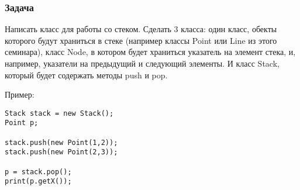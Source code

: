 \begin{frame}[fragile]
	\frametitle{Задача}
Написать класс для работы со стеком.
Сделать 3 класса: один класс, обекты которого будут храниться в стеке (например классы Point или Line из этого семинара), класс Node, в котором будет храниться указатель на элемент стека, и, например, указатели на предыдущий и следующий элементы. И класс Stack, который будет содержать методы push и pop.

Пример:

\begin{verbatim}
Stack stack = new Stack();
Point p;

stack.push(new Point(1,2));
stack.push(new Point(2,3));

p = stack.pop();
print(p.getX());
\end{verbatim}

	
\end{frame}
